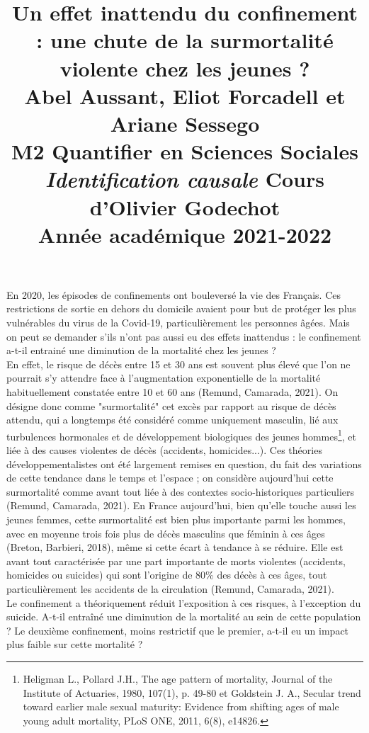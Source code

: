 \documentclass[titlepage]{article}
\title{\centering 

\vspace{1 cm}

{\begin{minipage}\linewidth
        \centering
     \textbf{Un effet inattendu du confinement : une chute de la surmortalité violente chez les jeunes ?} \\[1 cm] 
        \vspace{0.5cm}
        \large Abel Aussant, Eliot Forcadell et Ariane Sessego\\
         M2 Quantifier en Sciences Sociales\\
        \vspace{0.5cm}
         \textit{Identification causale} Cours d'Olivier Godechot \\
         Année académique 2021-2022\\
    \end{minipage}}
  }
\date{}
\begin{document}


\maketitle

\cleardoublepage%

En 2020, les épisodes de confinements ont bouleversé la vie des Français. Ces restrictions de sortie en dehors du domicile avaient pour but de protéger les plus vulnérables du virus de la Covid-19, particulièrement les personnes âgées. Mais on peut se demander s'ils n'ont pas aussi eu des effets inattendus : le confinement a-t-il entrainé une diminution de la mortalité chez les jeunes ? \\

En effet, le risque de décès entre 15 et 30 ans est souvent plus élevé que l'on ne pourrait s'y attendre face à l'augmentation exponentielle de la mortalité habituellement constatée entre 10 et 60 ans (Remund, Camarada, 2021). On désigne donc comme "surmortalité" cet excès par rapport au risque de décès attendu, qui a longtemps été considéré comme uniquement masculin, lié aux turbulences hormonales et de développement biologiques des jeunes hommes\footnote{Heligman L., Pollard J.H., The age pattern of mortality, Journal of the Institute of Actuaries, 1980, 107(1), p. 49-80 et  Goldstein J. A., Secular trend toward earlier male sexual maturity: Evidence from shifting ages of male young adult mortality, PLoS ONE, 2011, 6(8), e14826.}, et liée à des causes violentes de décès (accidents, homicides...). Ces théories développementalistes ont été largement remises en question, du fait des variations de cette tendance dans le temps et l'espace ; on considère aujourd'hui cette surmortalité comme avant tout liée à des contextes socio-historiques particuliers (Remund, Camarada, 2021). En France aujourd'hui, bien qu'elle touche aussi les jeunes femmes, cette surmortalité est bien plus importante parmi les hommes, avec en moyenne trois fois plus de décès masculins que féminin à ces âges (Breton, Barbieri, 2018), même si cette écart à tendance à se réduire. Elle est avant tout caractérisée par une part importante de morts violentes (accidents, homicides ou suicides) qui sont l'origine de 80\% des décès à ces âges, tout particulièrement les accidents de la circulation (Remund, Camarada, 2021). \\

Le confinement a théoriquement réduit l'exposition à ces risques, à l'exception du suicide. A-t-il entraîné une diminution de la mortalité au sein de cette population ? Le deuxième confinement, moins restrictif que le premier, a-t-il eu un impact plus faible sur cette mortalité ? \\
\end{document}
